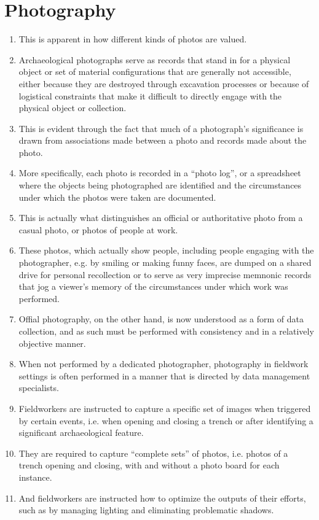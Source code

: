 \documentclass{article}
\begin{document}
\section{Photography}
\begin{enumerate}
  \item This is apparent in how different kinds of photos are valued.
  \item Archaeological photographs serve as records that stand in for a physical object or set of material configurations that are generally not accessible, either because they are destroyed through excavation processes or because of logistical constraints that make it difficult to directly engage with the physical object or collection.
  \item This is evident through the fact that much of a photograph’s significance is drawn from associations made between a photo and records made about the photo.
  \item More specifically, each photo is recorded in a ``photo log'', or a spreadsheet where the objects being photographed are identified and the circumstances under which the photos were taken are documented.
  \item This is actually what distinguishes an official or authoritative photo from a casual photo, or photos of people at work.
  \item These photos, which actually show people, including people engaging with the photographer, e.g. by smiling or making funny faces, are dumped on a shared drive for personal recollection or to serve as very imprecise memnonic records that jog a viewer's memory of the circumstances under which work was performed.
  \item Offial photography, on the other hand, is now understood as a form of data collection, and as such must be performed with consistency and in a relatively objective manner.
  \item When not performed by a dedicated photographer, photography in fieldwork settings is often performed in a manner that is directed by data management specialists.
  \item Fieldworkers are instructed to capture a specific set of images when triggered by certain events, i.e. when opening and closing a trench or after identifying a significant archaeological feature.
  \item They are required to capture ``complete sets'' of photos, i.e. photos of a trench opening and closing, with and without a photo board for each instance.
  \item And fieldworkers are instructed how to optimize the outputs of their efforts, such as by managing lighting and eliminating problematic shadows.

\end{enumerate}
\end{document}
